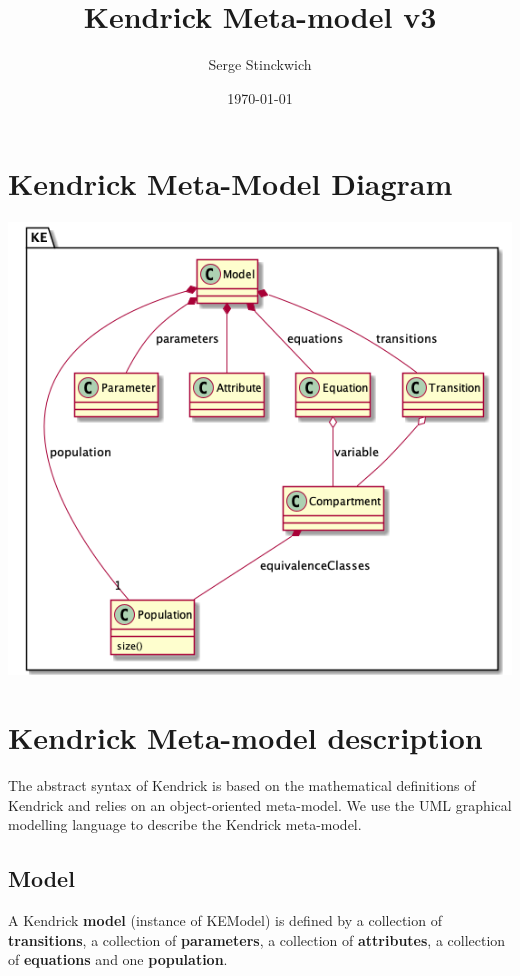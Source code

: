 \documentclass[11pt]{article}
\author{Serge Stinckwich}
\date{\today}
\title{Kendrick Meta-model v3}
\begin{document}
\maketitle

\section{Kendrick Meta-Model Diagram}
\label{sec:orgfc5378f}
\begin{center}
\includegraphics[width=.9\linewidth]{meta-modelv3.png}
\end{center}

\section{Kendrick Meta-model description}
\label{sec:orgd880a98}

The abstract syntax of Kendrick is based on the mathematical definitions of Kendrick
and relies on an object-oriented meta-model.
We use the UML graphical modelling language to describe the Kendrick meta-model.

\subsection{Model}
\label{sec:org31f7abb}
A Kendrick \textbf{model} (instance of KEModel) is defined by a collection of \textbf{transitions}, a collection of \textbf{parameters}, a collection of \textbf{attributes}, a collection of \textbf{equations} and one \textbf{population}.
\end{document}
